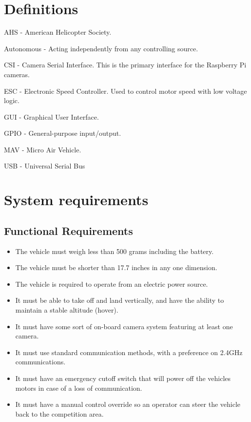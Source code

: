 \documentclass[onecolumn, draftclsnofoot,10pt, compsoc]{IEEEtran}
\begin{document}
\section{Definitions} %
\begin{description}
		\item{AHS} -  American Helicopter Society.
        \item{Autonomous} -  Acting independently from any controlling source.
        \item{CSI} - Camera Serial Interface. This is the primary interface for the Raspberry Pi cameras. 
        \item{ESC} - Electronic Speed Controller. Used to control motor speed with low voltage logic. 
        \item{GUI} -  Graphical User Interface.
        \item{GPIO} - General-purpose input/output.
        \item{MAV} -  Micro Air Vehicle.
        \item{USB} - Universal Serial Bus
        
\end{description}     


\section{System requirements} 


\subsection{Functional Requirements}  

\begin{itemize}
\item The vehicle must weigh less than 500 grams including the battery.
\item The vehicle must be shorter than 17.7 inches in any one dimension. 
\item The vehicle is required to operate from an electric power source.
\item It must be able to take off and land vertically, and have the ability to maintain a stable altitude (hover).
\item It must have some sort of on-board camera system featuring at least one camera.
\item It must use standard communication methods, with a preference on 2.4GHz communications.
\item It must have an emergency cutoff switch that will power off the vehicles motors in case of a loss of communication.
\item It must have a manual control override so an operator can steer the vehicle back to the competition area. 
\end{itemize}
\end{document}
